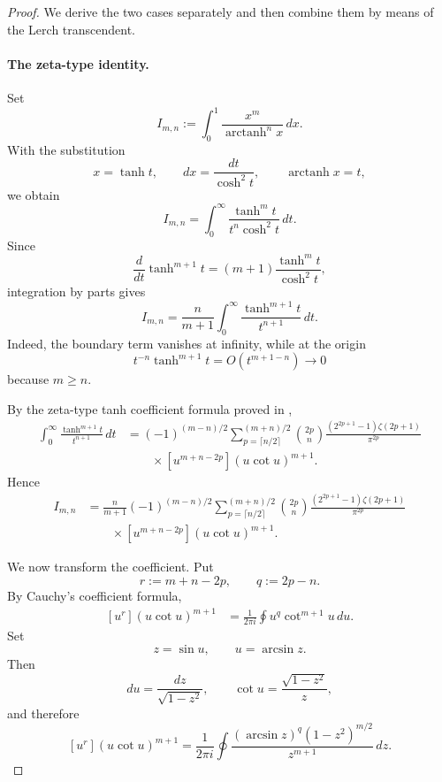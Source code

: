 \documentclass[11pt,twoside]{article}
\numberwithin{equation}{section}
\begin{document}
\begin{proof}
We derive the two cases separately and then combine them by means of
the Lerch transcendent.

\paragraph{The zeta-type identity.}
Set
\[
I_{m,n}
:=
\int_0^1
\frac{x^m}{\operatorname{arctanh}^n x}\,dx.
\]
With the substitution
\[
x=\tanh t,
\qquad
dx=\frac{dt}{\cosh^2 t},
\qquad
\operatorname{arctanh}x=t,
\]
we obtain
\[
I_{m,n}
=
\int_0^\infty
\frac{\tanh^m t}{t^n\cosh^2 t}\,dt.
\]
Since
\[
\frac{d}{dt}\tanh^{m+1}t
=
(m+1)\frac{\tanh^m t}{\cosh^2 t},
\]
integration by parts gives
\[
I_{m,n}
=
\frac{n}{m+1}
\int_0^\infty
\frac{\tanh^{m+1}t}{t^{n+1}}\,dt.
\]
Indeed, the boundary term vanishes at infinity, while at the origin
\[
t^{-n}\tanh^{m+1}t
=
O(t^{m+1-n})
\longrightarrow 0
\]
because $m\ge n$.

By the zeta-type tanh coefficient formula proved in
\cite[Prop.~3.4]{TallaWaffo2026},
\[
\begin{aligned}
\int_0^\infty
\frac{\tanh^{m+1}t}{t^{n+1}}\,dt
&=
(-1)^{(m-n)/2}
\sum_{p=\lceil n/2\rceil}^{(m+n)/2}
\binom{2p}{n}
\frac{(2^{2p+1}-1)\zeta(2p+1)}
{\pi^{2p}}
\\
&\qquad\times
[u^{m+n-2p}]
(u\cot u)^{m+1}.
\end{aligned}
\]
Hence
\[
\begin{aligned}
I_{m,n}
&=
\frac{n}{m+1}
(-1)^{(m-n)/2}
\sum_{p=\lceil n/2\rceil}^{(m+n)/2}
\binom{2p}{n}
\frac{(2^{2p+1}-1)\zeta(2p+1)}
{\pi^{2p}}
\\
&\qquad\times
[u^{m+n-2p}]
(u\cot u)^{m+1}.
\end{aligned}
\]

We now transform the coefficient. Put
\[
r:=m+n-2p,
\qquad
q:=2p-n.
\]
By Cauchy's coefficient formula,
\[
\begin{aligned}
[u^r](u\cot u)^{m+1}
&=
\frac{1}{2\pi i}
\oint
u^q\cot^{m+1}u\,du.
\end{aligned}
\]
Set
\[
z=\sin u,
\qquad
u=\arcsin z.
\]
Then
\[
du=\frac{dz}{\sqrt{1-z^2}},
\qquad
\cot u=\frac{\sqrt{1-z^2}}{z},
\]
and therefore
\[
[u^r](u\cot u)^{m+1}
=
\frac{1}{2\pi i}
\oint
\frac{
(\arcsin z)^q(1-z^2)^{m/2}
}{
z^{m+1}
}\,dz.
\]


\end{proof}
\end{document}
